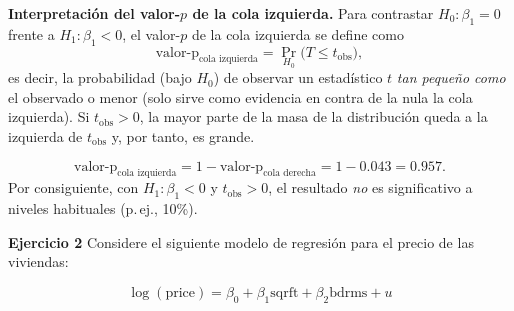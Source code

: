 \documentclass[11pt]{article}
\begin{document}
{\begin{figure}[H]
\end{figure}

{\bf Interpretación del valor-$p$ de la cola izquierda.}
Para contrastar $H_0:\beta_1=0$ frente a $H_1:\beta_1<0$, el valor-$p$ de la cola izquierda se define como
\[
\text{valor-p}_{\text{cola izquierda}}=\Pr_{H_0}\!\big(T \le t_{\text{obs}}\big),
\]
es decir, la probabilidad (bajo $H_0$) de observar un estadístico $t$ \emph{tan pequeño como} el observado o menor (solo sirve como evidencia en contra de la nula la cola izquierda).
Si $t_{\text{obs}}>0$, la mayor parte de la masa de la distribución queda a la izquierda de $t_{\text{obs}}$ y, por tanto, es grande.

\[
\text{valor-p}_{\text{cola izquierda}}=1-\text{valor-p}_{\text{cola derecha}}=1-0.043=0.957.
\]
\noindent
Por consiguiente, con $H_1:\beta_1<0$ y $t_{\text{obs}}>0$, el resultado \emph{no} es significativo a niveles habituales (p.\,ej., 10\%).
}

{\bf Ejercicio 2} Considere el siguiente modelo de regresión para el precio de las viviendas:

\[
\log(\text{price}) = \beta_0 + \beta_1 \text{sqrft} + \beta_2 \text{bdrms} + u
\]
\end{document}

